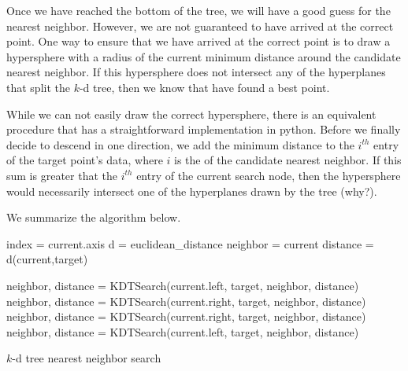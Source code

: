 Once we have reached the bottom of the tree, we will have a good guess for the nearest neighbor.
However, we are not guaranteed to have arrived at the correct point.
One way to ensure that we have arrived at the correct point is to draw a hypersphere with a radius of the current minimum distance around the candidate nearest neighbor.
If this hypersphere does not intersect any of the hyperplanes that split the $k$-d tree, then we know that have found a best point.

While we can not easily draw the correct hypersphere, there is an equivalent procedure that has a straightforward implementation in python.
Before we finally decide to descend in one direction, we add the minimum distance to the $i^{th}$ entry of the target point's data, where $i$ is the  of the candidate nearest neighbor.
If this sum is greater that the $i^{th}$ entry of the current search node, then the hypersphere would necessarily intersect one of the hyperplanes drawn by the tree (why?).

We summarize the algorithm below.

\begin{algorithm}
\begin{algorithmic}[1]
\State index = current.axis
\State d = euclidean\_distance
		\State neighbor = current
		\State distance = d(current,target)
	\EndIf
	
		\State neighbor, distance = KDTSearch(current.left, target,
			\State									neighbor, distance)
			\State neighbor, distance = KDTSearch(current.right, target,
				\State									neighbor, distance)
		\EndIf
	\Else
		\State neighbor, distance = KDTSearch(current.right, target,
			\State									neighbor, distance)
			\State neighbor, distance = KDTSearch(current.left, target,
				\State									neighbor, distance)
		\EndIf
	\EndIf
\EndProcedure
\end{algorithmic}
\caption{$k$-d tree nearest neighbor search}
\label{alg:kdneighborz}
\end{algorithm}


